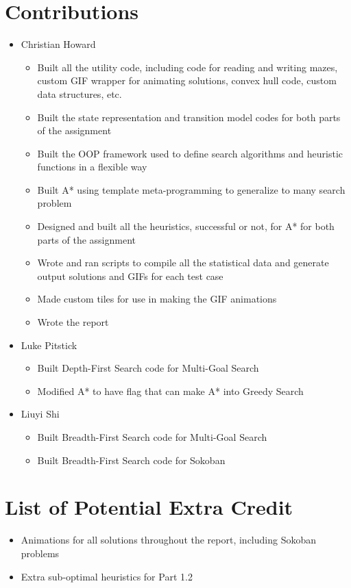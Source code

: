 \documentclass{article}[12pt]
\begin{document}
\section{Contributions}
\begin{itemize}
\item Christian Howard
	\begin{itemize}
	\item Built all the utility code, including code for reading and writing mazes, custom GIF wrapper for animating solutions, convex hull code, custom data structures, etc.
	\item Built the state representation and transition model codes for both parts of the assignment
	\item Built the OOP framework used to define search algorithms and heuristic functions in a flexible way
	\item Built A* using template meta-programming to generalize to many search problem
	\item Designed and built all the heuristics, successful or not, for A* for both parts of the assignment
	\item Wrote and ran scripts to compile all the statistical data and generate output solutions and GIFs for each test case
	\item Made custom tiles for use in making the GIF animations
	\item Wrote the report
	\end{itemize}
\item Luke Pitstick
	\begin{itemize}
	\item Built Depth-First Search code for Multi-Goal Search
	\item Modified A* to have flag that can make A* into Greedy Search
	\end{itemize}
\item Liuyi Shi
	\begin{itemize}
	\item Built Breadth-First Search code for Multi-Goal Search
	\item Built Breadth-First Search code for Sokoban
	\end{itemize}
\end{itemize}   
   
   
\newpage
   \section{List of Potential Extra Credit}
   \begin{itemize}
   \item Animations for all solutions throughout the report, including Sokoban problems
   \item Extra sub-optimal heuristics for Part 1.2
\end{itemize}      
   
\end{document}
